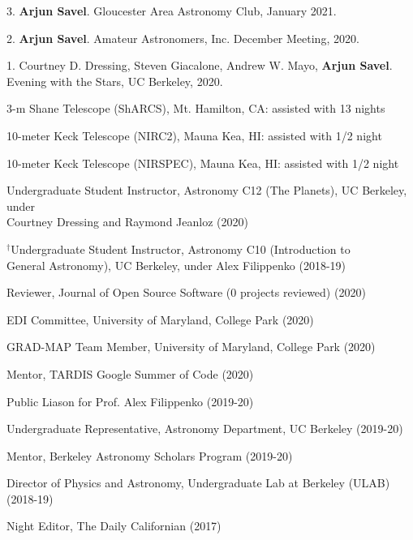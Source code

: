 \documentclass[12pt,letterpaper]{article}
\begin{document}
\begin{list}{}{\cvlist}
\item 3. \textbf{Arjun Savel}. Gloucester Area Astronomy Club, January 2021.
\item 2. \textbf{Arjun Savel}. Amateur Astronomers, Inc. December Meeting, 2020.
\item 1. Courtney D. Dressing, Steven Giacalone, Andrew W. Mayo, \textbf{Arjun Savel}. Evening with the Stars, UC Berkeley, 2020.
\end{list}



\begin{list}{}{\cvlist}

\item 3-m Shane Telescope (ShARCS), Mt. Hamilton, CA: assisted with 13 nights
\item 10-meter Keck Telescope (NIRC2), Mauna Kea, HI: assisted with 1/2 night
\item 10-meter Keck Telescope (NIRSPEC), Mauna Kea, HI: assisted with 1/2 night

\end{list}


\begin{list}{}{\cvlist}
\item Undergraduate Student Instructor, Astronomy C12 (The Planets), UC Berkeley, under \\ Courtney Dressing and Raymond Jeanloz (2020)
\item $^\dagger$Undergraduate Student Instructor, Astronomy C10 (Introduction to \\ General Astronomy), UC Berkeley, under Alex Filippenko (2018-19)
\end{list}

\begin{list}{}{\cvlist}
\item Reviewer, Journal of Open Source Software (0 projects reviewed) (2020)
\item EDI Committee, University of Maryland, College Park (2020)
\item GRAD-MAP Team Member, University of Maryland, College Park (2020)
\item Mentor, TARDIS Google Summer of Code (2020)
\item Public Liason for Prof. Alex Filippenko (2019-20)
\item Undergraduate Representative, Astronomy Department, UC Berkeley (2019-20)
\item Mentor, Berkeley Astronomy Scholars Program (2019-20)
\item Director of Physics and Astronomy, Undergraduate Lab at Berkeley (ULAB) (2018-19)
\item Night Editor, The Daily Californian (2017)
\end{list}
\end{document}
